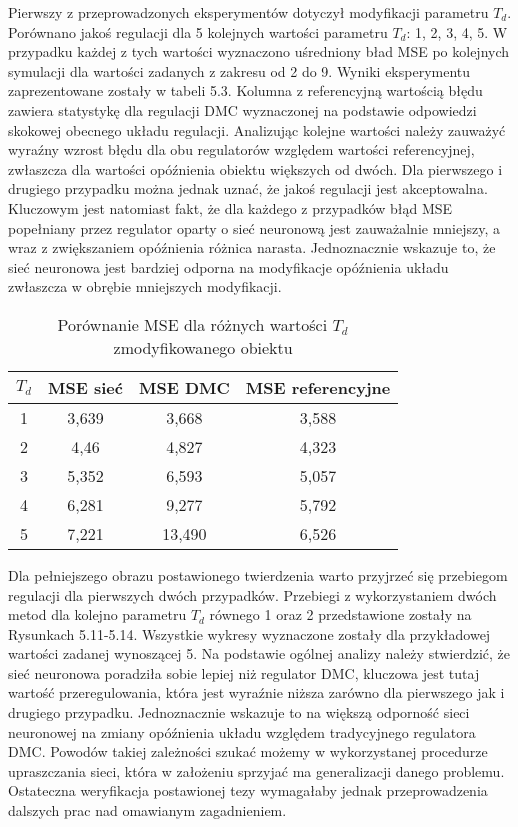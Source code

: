 \par Pierwszy z przeprowadzonych eksperymentów dotyczył modyfikacji parametru \(T_d\). Porównano jakoś regulacji dla 5 kolejnych wartości parametru \(T_d\): 1, 2, 3, 4, 5. W przypadku każdej z tych wartości wyznaczono uśredniony bład MSE po kolejnych symulacji dla wartości zadanych z zakresu od 2 do 9. Wyniki eksperymentu zaprezentowane zostały w tabeli 5.3. Kolumna z referencyjną wartością błędu zawiera statystykę dla regulacji DMC wyznaczonej na podstawie odpowiedzi skokowej obecnego układu regulacji. Analizując kolejne wartości należy zauważyć wyraźny wzrost błędu dla obu regulatorów względem wartości referencyjnej, zwłaszcza dla wartości opóźnienia obiektu większych od dwóch. Dla pierwszego i drugiego przypadku można jednak uznać, że jakoś regulacji jest akceptowalna.  Kluczowym jest natomiast fakt, że dla każdego z przypadków błąd MSE popełniany przez regulator oparty o sieć neuronową jest zauważalnie mniejszy, a wraz z zwiększaniem opóźnienia różnica narasta. Jednoznacznie wskazuje to, że sieć neuronowa jest bardziej odporna na modyfikacje opóźnienia układu zwłaszcza w obrębie mniejszych modyfikacji. 

\begin{table}[!h] \label{tab:tabela3} \centering
\caption{Porównanie MSE dla różnych wartości \(T_d\) zmodyfikowanego obiektu}
\begin{tabular} {| c | c | c | c |} \hline
    \(T_d\) & MSE sieć & MSE DMC & MSE referencyjne \\ \hline\hline
    1 & 3,639 & 3,668 & 3,588 \\ \hline
    2 & 4,46 & 4,827 & 4,323 \\ \hline
    3 & 5,352 & 6,593 & 5,057 \\ \hline
    4 & 6,281 & 9,277 & 5,792 \\ \hline
    5 & 7,221 & 13,490 & 6,526 \\ \hline
\end{tabular}
\end{table}

\par Dla pełniejszego obrazu postawionego twierdzenia warto przyjrzeć się przebiegom regulacji dla pierwszych dwóch przypadków. Przebiegi z wykorzystaniem dwóch metod dla kolejno parametru \(T_d\) równego 1 oraz 2 przedstawione zostały na Rysunkach 5.11-5.14. Wszystkie wykresy wyznaczone zostały dla przykładowej wartości zadanej wynoszącej 5. Na podstawie ogólnej analizy należy stwierdzić, że sieć neuronowa poradziła sobie lepiej niż regulator DMC, kluczowa jest tutaj wartość przeregulowania, która jest wyraźnie niższa zarówno dla pierwszego jak i drugiego przypadku. Jednoznacznie wskazuje to na większą odporność sieci neuronowej na zmiany opóźnienia układu względem tradycyjnego regulatora DMC. Powodów takiej zależności szukać możemy w wykorzystanej procedurze upraszczania sieci, która w założeniu sprzyjać ma generalizacji danego problemu. Ostateczna weryfikacja postawionej tezy wymagałaby jednak przeprowadzenia dalszych prac nad omawianym zagadnieniem. 

